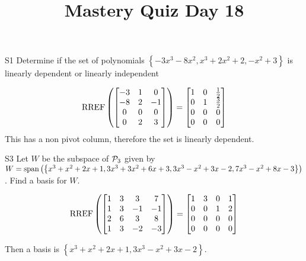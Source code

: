 \documentclass{sbgLAquiz}
\title{Mastery Quiz Day 18 }
\begin{document}
\begin{problem}{S1}
Determine if the set of polynomials $\left\{ -3x^3-8x^2, x^3+2x^2+2, -x^2+3\right\}$ is  linearly dependent or linearly independent
\end{problem}
\begin{solution}
$$\RREF\left( \begin{bmatrix}-3 & 1 & 0 \\ -8 & 2 & -1 \\ 0 & 0 & 0 \\ 0 & 2 & 3 \end{bmatrix}\right) = \begin{bmatrix} 1 & 0 & \frac{1}{2} \\ 0 & 1 & \frac{3}{2} \\ 0 & 0 & 0 \\ 0 & 0 & 0 \end{bmatrix}$$ 
This has a non pivot column, therefore the set is linearly dependent.
\end{solution}


\begin{problem}{S3}
Let $W$ be the subspace of $\P_3$ given by $W = {\rm span} \left( \left\{ x^3+x^2+2x+1, 3x^3+3x^2+6x+3, 3x^3-x^2+3x-2, 7x^3-x^2+8x-3 \right\} \right)$.  Find a basis for $W$.
\end{problem}
\begin{solution}
$$\RREF\left(\begin{bmatrix} 1 & 3 & 3 & 7 \\ 1 & 3 & -1 & -1 \\ 2 & 6 & 3 & 8 \\ 1 & 3 & -2 & -3 \end{bmatrix}\right) = \begin{bmatrix} 1 & 3 & 0 & 1 \\ 0 & 0 & 1 & 2 \\ 0 & 0 & 0 & 0 \\  0 & 0 & 0 & 0 \end{bmatrix}$$

Then a basis is 
$ \left\{ x^3+x^2+2x+1, 3x^3-x^2+3x-2 \right\} $.
\end{solution}
\end{document}

